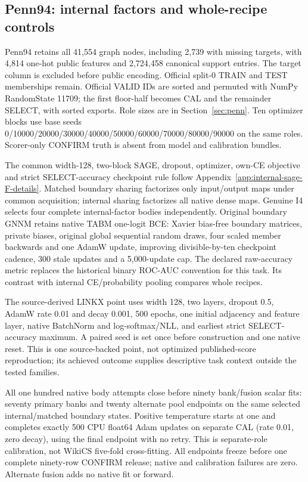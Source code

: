 \subsection{Penn94: internal factors and whole-recipe controls}\label{app:penn-v5}
Penn94 retains all 41,554 graph nodes, including 2,739 with missing targets, with 4,814 one-hot public features and 2,724,458 canonical support entries. The target column is excluded before public encoding. Official split-0 TRAIN and TEST memberships remain. Official VALID IDs are sorted and permuted with NumPy RandomState 11709; the first floor-half becomes CAL and the remainder SELECT, with sorted exports. Role sizes are in Section~\ref{sec:penn}. Ten optimizer blocks use base seeds 0/10000/20000/30000/40000/50000/60000/70000/80000/90000 on the same roles. Scorer-only CONFIRM truth is absent from model and calibration bundles.

The common width-128, two-block SAGE, dropout, optimizer, own-CE objective and strict SELECT-accuracy checkpoint rule follow Appendix~\ref{app:internal-sage-F-details}. Matched boundary sharing factorizes only input/output maps under common acquisition; internal sharing factorizes all native dense maps. Genuine I4 selects four complete internal-factor bodies independently. Original boundary GNNM retains native TABM one-logit BCE: Xavier bias-free boundary matrices, private biases, original global sequential random draws, four scaled member backwards and one AdamW update, improving divisible-by-ten checkpoint cadence, 300 stale updates and a 5,000-update cap. The declared raw-accuracy metric replaces the historical binary ROC-AUC convention for this task. Its contrast with internal CE/probability pooling compares whole recipes.

The source-derived LINKX point uses width 128, two layers, dropout 0.5, AdamW rate 0.01 and decay 0.001, 500 epochs, one initial adjacency and feature layer, native BatchNorm and log-softmax/NLL, and earliest strict SELECT-accuracy maximum. A paired seed is set once before construction and one native reset. This is one source-backed point, not optimized published-score reproduction; its achieved outcome supplies descriptive task context outside the tested families.

All one hundred native body attempts close before ninety bank/fusion scalar fits: seventy primary banks and twenty alternate pool endpoints on the same selected internal/matched boundary states. Positive temperature starts at one and completes exactly 500 CPU float64 Adam updates on separate CAL (rate 0.01, zero decay), using the final endpoint with no retry. This is separate-role calibration, not WikiCS five-fold cross-fitting. All endpoints freeze before one complete ninety-row CONFIRM release; native and calibration failures are zero. Alternate fusion adds no native fit or forward.

